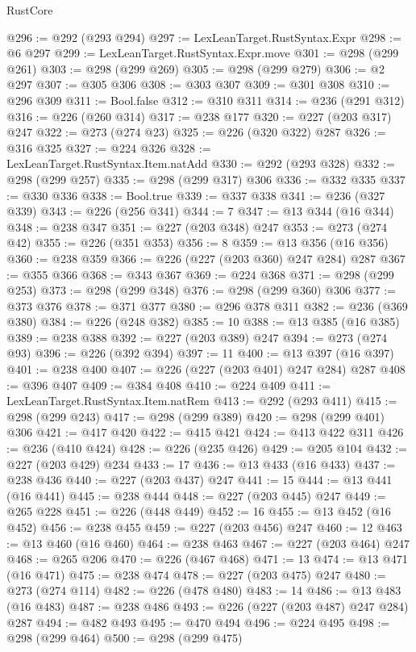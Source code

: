 \begin{lexlean}{RustCore}
\begin{coremodule}
@296 := @292 (@293 @294)
@297 := LexLeanTarget.RustSyntax.Expr
@298 := @6 @297
@299 := LexLeanTarget.RustSyntax.Expr.move
@301 := @298 (@299 @261)
@303 := @298 (@299 @269)
@305 := @298 (@299 @279)
@306 := @2 @297
@307 := @305 @306
@308 := @303 @307
@309 := @301 @308
@310 := @296 @309
@311 := Bool.false
@312 := @310 @311
@314 := @236 (@291 @312)
@316 := @226 (@260 @314)
@317 := @238 @177
@320 := @227 (@203 @317) @247
@322 := @273 (@274 @23)
@325 := @226 (@320 @322) @287
@326 := @316 @325
@327 := @224 @326
@328 := LexLeanTarget.RustSyntax.Item.natAdd
@330 := @292 (@293 @328)
@332 := @298 (@299 @257)
@335 := @298 (@299 @317) @306
@336 := @332 @335
@337 := @330 @336
@338 := Bool.true
@339 := @337 @338
@341 := @236 (@327 @339)
@343 := @226 (@256 @341)
@344 := 7
@347 := @13 @344 (@16 @344)
@348 := @238 @347
@351 := @227 (@203 @348) @247
@353 := @273 (@274 @42)
@355 := @226 (@351 @353)
@356 := 8
@359 := @13 @356 (@16 @356)
@360 := @238 @359
@366 := @226 (@227 (@203 @360) @247 @284) @287
@367 := @355 @366
@368 := @343 @367
@369 := @224 @368
@371 := @298 (@299 @253)
@373 := @298 (@299 @348)
@376 := @298 (@299 @360) @306
@377 := @373 @376
@378 := @371 @377
@380 := @296 @378 @311
@382 := @236 (@369 @380)
@384 := @226 (@248 @382)
@385 := 10
@388 := @13 @385 (@16 @385)
@389 := @238 @388
@392 := @227 (@203 @389) @247
@394 := @273 (@274 @93)
@396 := @226 (@392 @394)
@397 := 11
@400 := @13 @397 (@16 @397)
@401 := @238 @400
@407 := @226 (@227 (@203 @401) @247 @284) @287
@408 := @396 @407
@409 := @384 @408
@410 := @224 @409
@411 := LexLeanTarget.RustSyntax.Item.natRem
@413 := @292 (@293 @411)
@415 := @298 (@299 @243)
@417 := @298 (@299 @389)
@420 := @298 (@299 @401) @306
@421 := @417 @420
@422 := @415 @421
@424 := @413 @422 @311
@426 := @236 (@410 @424)
@428 := @226 (@235 @426)
@429 := @205 @104
@432 := @227 (@203 @429) @234
@433 := 17
@436 := @13 @433 (@16 @433)
@437 := @238 @436
@440 := @227 (@203 @437) @247
@441 := 15
@444 := @13 @441 (@16 @441)
@445 := @238 @444
@448 := @227 (@203 @445) @247
@449 := @265 @228
@451 := @226 (@448 @449)
@452 := 16
@455 := @13 @452 (@16 @452)
@456 := @238 @455
@459 := @227 (@203 @456) @247
@460 := 12
@463 := @13 @460 (@16 @460)
@464 := @238 @463
@467 := @227 (@203 @464) @247
@468 := @265 @206
@470 := @226 (@467 @468)
@471 := 13
@474 := @13 @471 (@16 @471)
@475 := @238 @474
@478 := @227 (@203 @475) @247
@480 := @273 (@274 @114)
@482 := @226 (@478 @480)
@483 := 14
@486 := @13 @483 (@16 @483)
@487 := @238 @486
@493 := @226 (@227 (@203 @487) @247 @284) @287
@494 := @482 @493
@495 := @470 @494
@496 := @224 @495
@498 := @298 (@299 @464)
@500 := @298 (@299 @475)

\end{coremodule}
\end{lexlean}
